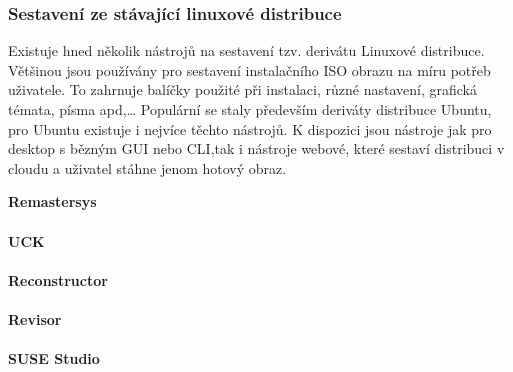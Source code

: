 \documentclass[a4paper,12pt]{article}
\newcommand{\nadpis}[1]{%
	\vspace{4 mm}
	\textbf{#1}\\
	\vspace{4 mm}
	}
\begin{document}
\subsubsection{Sestavení ze stávající linuxové distribuce}
Existuje hned několik nástrojů na sestavení tzv. derivátu Linuxové distribuce. Většinou jsou používány pro sestavení instalačního ISO obrazu na míru potřeb uživatele. To zahrnuje balíčky použité při instalaci, různé nastavení, grafická témata, písma apd,… Populární se staly především deriváty distribuce Ubuntu, pro Ubuntu existuje i nejvíce těchto nástrojů. K dispozici jsou nástroje jak pro desktop s bězným GUI nebo CLI,tak i nástroje webové, které sestaví distribuci v cloudu a uživatel stáhne jenom hotový obraz.

\nadpis{Remastersys}\\
\nadpis{UCK}\\
\nadpis{Reconstructor}\\
\nadpis{Revisor}\\
\nadpis{SUSE Studio}\\
\end{document}
